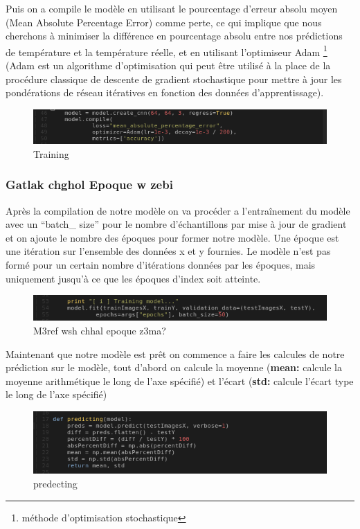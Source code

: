 \documentclass[12pt]{article}
\begin{document}
Puis on a compile le modèle en utilisant le pourcentage d'erreur absolu moyen (Mean Absolute Percentage Error) comme perte, ce qui implique que nous cherchons à minimiser la différence en pourcentage absolu entre nos prédictions de température et la température réelle, et en utilisant l'optimiseur Adam \footnote{méthode d'optimisation stochastique} (Adam est un algorithme d'optimisation qui peut être utilisé à la place de la procédure classique de descente de gradient stochastique pour mettre à jour les pondérations de réseau itératives en fonction des données d'apprentissage).

\begin{figure}[h]
	\centering
	\includegraphics[width=15cm]{img-Chapiter-4/training.png}
	\caption{Training}
\end{figure}

\subsubsection*{Gatlak chghol Epoque w zebi}
Après la compilation de notre modèle on va procéder a l’entraînement du modèle avec un “batch\_ size” pour le nombre d'échantillons par mise à jour de gradient et on ajoute le nombre des époques pour former notre modèle. Une époque est une itération sur l'ensemble des données x et y fournies. Le modèle n'est pas formé pour un certain nombre d'itérations données par les époques, mais uniquement jusqu'à ce que les époques d'index soit atteinte.

\begin{figure}[h]
	\centering
	\includegraphics[width=15cm]{img-Chapiter-4/train.png}
	\caption{M3ref wsh chhal epoque z3ma?}
\end{figure}

Maintenant que notre modèle est prêt on commence a faire les calcules de notre prédiction sur le modèle, tout d'abord on calcule la moyenne (\textbf{mean:} calcule la moyenne arithmétique le long de l'axe spécifié) et l’écart (\textbf{std:} calcule l'écart type le long de l'axe spécifié)

\begin{figure}[h]
	\centering
	\includegraphics[width=15cm]{img-Chapiter-4/predecting.png}
	\caption{predecting}
\end{figure}
\end{document}
